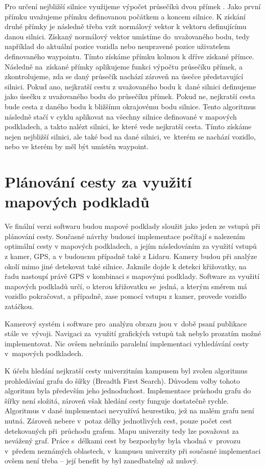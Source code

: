 \documentclass[czech, bachelor]{diploma}
\begin{document}
Pro určení nejbližší silnice využijeme výpočet průsečíků dvou přímek \cite{line-line-intersection-source}.
Jako první přímku uvažujeme přímku definovanou počátkem a koncem silnice. K získání druhé přímky je následně třeba vzít normálový
vektor k vektoru definujícímu danou silnici. Získaný normálový vektor umístíme do~uvažovaného bodu, tedy například do aktuální
pozice vozidla nebo neupravené pozice uživatelem definovaného waypointu. Tímto získáme přímku kolmou k dříve získané přímce.
Následně na~získané přímky aplikujeme funkci výpočtu průsečíku přímek, a zkontrolujeme, zda se daný průsečík nachází zároveň
na úsečce představující silnici. Pokud ano, nejkratší cestu z uvažovaného bodu k~dané silnici definujeme jako úsečku z uvažovaného
bodu do průsečíku přímek. Pokud ne, nejkratší cesta bude cesta z daného bodu k bližšímu okrajovému bodu silnice. Tento algoritmus
následně stačí v cyklu aplikovat na všechny silnice definované v mapových podkladech, a takto nalézt silnici, ke které vede
nejkratší cesta. Tímto získáme nejen nejbližší silnici, ale také bod na dané silnici, ve~kterém se nachází vozidlo, nebo ve kterém
by měl být umístěn waypoint.

\section{Plánování cesty za využití mapových podkladů}

Ve finální verzi softwaru budou mapové podklady sloužit jako jeden ze vstupů při plánování cesty. Současné návrhy budoucí
implementace počítají s nalezením optimální cesty v mapových podkladech, a jejím následováním za využití vstupů z kamer, GPS, 
a v budoucnu případně také z Lidaru. Kamery budou při analýze okolí mimo jiné detekovat také silnice. Jakmile dojde k detekci
křižovatky, na řadu nastoupí právě GPS v kombinaci s mapovými podklady. Software za využití mapových podkladů určí, o kterou
křižovatku se~jedná, a kterým směrem má vozidlo pokračovat, a případně, zase pomocí vstupu z kamer, provede vozidlo zatáčkou.

Kamerový systém i software pro~analýzu obrazu jsou v~době psaní publikace stále ve~vývoji. Navigaci za~využití grafických vstupů
tak nebylo prozatím možné implementovat. Nic ovšem nebránilo paralelní implementaci vyhledávání cesty v~mapových podkladech.

K účelu hledání nejkratší cesty univerzitním kampusem byl zvolen algoritmus prohledávání grafu do šířky (Breadth First Search).
Důvodem volby tohoto algoritmu byla především jeho jednoduchost. Implementace průchodu grafu do šířky není složitá, zároveň však
hledání cesty funguje dostatečně rychle. Algoritmus v dané implementaci nevyužívá heurestiku, jež na malém grafu není nutná.
Zároveň nebere v~potaz délky jednotlivých cest, pouze počet cest detekovaných při~průchodu grafem. Mapu univerzity tedy lze 
považovat za nevážený graf. Práce s~délkami cest by bezpochyby byla vhodná v~provozu v~předem neznámých oblastech, v~kampusu 
univerzity při současné implementaci ovšem není třeba -- její benefit by byl zanedbatelný až nulový.
\end{document}
